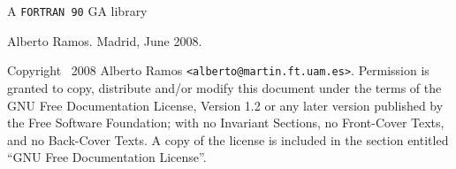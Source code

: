 \thispagestyle{titlingpage}
\begin{center}

\vspace*{1in}
{\Huge A \texttt{FORTRAN 90} GA library\par
}
\vspace*{\fill}

\vspace{1.2cm}
{Alberto Ramos. Madrid, June 2008.}

\end{center}

\newpage

Copyright \textcopyright\, 2008  Alberto Ramos
\texttt{<alberto@martin.ft.uam.es>}. 
Permission is granted to copy, distribute and/or modify this document
under the terms of the GNU Free Documentation License, Version 1.2
or any later version published by the Free Software Foundation;
with no Invariant Sections, no Front-Cover Texts, and no Back-Cover
Texts.  A copy of the license is included in the section entitled ``GNU
Free Documentation License''.



